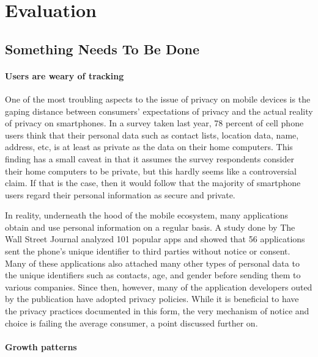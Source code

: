 \section{Evaluation}

	\subsection{Something Needs To Be Done}

		\paragraph {Users are weary of tracking}

One of the most troubling aspects to the issue of privacy on mobile devices is the gaping distance between consumers' expectations of privacy and the actual reality of privacy on smartphones. In a survey taken last year, 78 percent of cell phone users think that their personal data such as contact lists, location data, name, address, etc, is at least as private as the data on their home computers\cite{Jenn2012}. This finding has a small caveat in that it assumes the survey respondents consider their home computers to be private, but this hardly seems like a controversial claim. If that is the case, then it would follow that the majority of smartphone users regard their personal information as secure and private. 


In reality, underneath the hood of the mobile ecosystem, many applications obtain and use personal information on a regular basis. 
A study done by The Wall Street Journal analyzed 101 popular apps and showed that 56 applications sent the phone's unique identifier to third parties without notice or consent\cite{Thru2010}. Many of these applications also attached many other types of personal data to the unique identifiers such as contacts, age, and gender before sending them to various companies. Since then, however, many of the application developers outed by the publication have adopted privacy policies. While it is beneficial to have the privacy practices documented in this form, the very mechanism of notice and choice is failing the average consumer, a point discussed further on. 

		\paragraph {Growth patterns}


